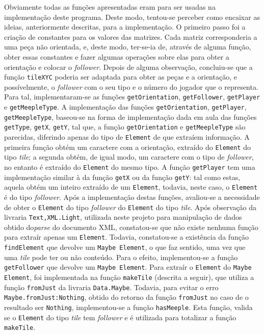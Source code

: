 Obviamente todas as funções apresentadas eram para ser usadas na implementação deste programa. Deste modo,
tentou-se perceber como encaixar as ideias, anteriormente  descritas, para a implementação. O primeiro passo
foi a  criação de  constantes para  os valores  das matrizes. Cada  matriz corresponderia  a uma  peça não
orientada,  e,  deste modo,  ter-se-ia  de,  através  de alguma  função,  obter  essas constantes  e  fazer
algumas  operações sobre  elas para  obter a  orientação  e colocar  o \emph{follower}.  Depois de  alguma
observação,  concluiu-se que  a função  \texttt{tileXYC} poderia  ser adaptada  para obter  as peças  e a
orientação, e  possívelmente, o \emph{follower}  com o seu  tipo e o número  do jogador que  o representa.
Para  tal, implementaram-se  as  funções  \texttt{getOrientation}, \texttt{getFollower},  \texttt{getPlayer}
e  \texttt{getMeepleType}.  A  implementação   das  funções  \texttt{getOrientation},  \texttt{getPlayer},
\texttt{getMeepleType}, baseou-se  na forma de  implementação dada  em aula das  funções \texttt{getType},
\texttt{getX},  \texttt{getY},  tal que,  a  função  \texttt{getOrientation} e  \texttt{getMeepleType}  são
parecidas,  diferindo  apenas  do  tipo  de   \texttt{Element}  de  que  extraíem  informação.  A  primeira
função  obtém um  caractere  com a  orientação,  extraído  do \texttt{Element}  do  tipo \emph{tile};  a
segunda  obtém, de  igual modo,  um caractere  com  o tipo  de \emph{follower},  no entanto  é extraído  do
\texttt{Element}  do  mesmo  tipo.  A  função  \texttt{getPlayer} tem  uma  implementação  similar  à  da
função  \texttt{getX} ou  da função  \texttt{getY}: tal  como estas,  aquela obtém  um inteiro  extraído
de  um  \texttt{Element},  todavia, neste  caso,  o  \texttt{Element}  é  do tipo  \emph{follower}.  Após  a
implementação destas funções, avaliou-se a necessidade de obter o \texttt{Element} do tipo \emph{follower}
do \texttt{Element}  do tipo  \emph{tile}. Após observação  da livraria  \texttt{Text,XML.Light}, utilizada
neste  projeto para  manipulação de  dados obtido  do\emph{parse} do  documento XML,  constatou-se que  não
existe  nenhuma função  para extraír  apenas um  \texttt{Element}. Todavia,  constatou-se a  existência da
função  \texttt{findElement} que  devolve um  \texttt{Maybe Element},  o que  faz sentido,  uma vez  que uma
\emph{tile}  pode  ter ou  não  conteúdo.  Para o  efeito,  implementou-se  a função  \texttt{getFollower}
que  devolve um  \texttt{Maybe  Element}. Para  extraír  o \texttt{Element}  do  \texttt{Maybe Element},  foi
implementada na  função \texttt{makeTile} (descrita a  seguir), que utiliza a  função \texttt{fromJust} da
livraria \texttt{Data.Maybe}. Todavia,  para evitar o erro \texttt{Maybe.fromJust:Nothing},  obtido do retorno
da  função  \texttt{fromJust}  no caso  de  o  resultado  ser  \texttt{Nothing}, implementou-se  a  função
\texttt{hasMeeple}. Esta função, valida  se o \texttt{Element} do tipo \emph{tile}  tem \emph{follower} e é
utilizada para totalizar a função \texttt{makeTile}.

